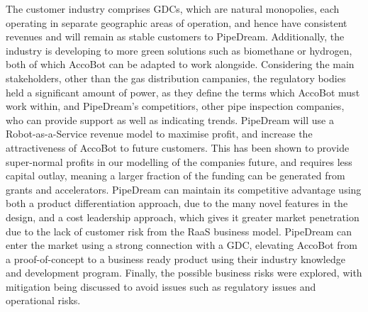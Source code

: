 \documentclass[11pt]{article}		%
\newcommand{\supercite}[1]{\textsuperscript{\cite{#1}}}		%
\begin{document}
        The customer industry comprises GDCs, which are natural monopolies, each operating in separate geographic areas of operation, and hence have consistent revenues and will remain as stable customers to PipeDream. Additionally, the industry is developing to more green solutions such as biomethane or hydrogen, both of which AccoBot can be adapted to work alongside.
        Considering the main stakeholders, other than the gas distribution campanies, the regulatory bodies held a significant amount of power, as they define the terms which AccoBot must work within, and PipeDream's competitiors, other pipe inspection companies, who can provide support as well as indicating trends.
        PipeDream will use a Robot-as-a-Service revenue model to maximise profit, and increase the attractiveness of AccoBot to future customers.
        This has been shown to provide super-normal profits in our modelling of the companies future, and requires less capital outlay, meaning a larger fraction of the funding can be generated from grants and accelerators.
        PipeDream can maintain its competitive advantage using both a product differentiation approach, due to the many novel features in the design, and a cost leadership approach, which gives it greater market penetration due to the lack of customer risk from the RaaS business model.
        PipeDream can enter the market using a strong connection with a GDC, elevating AccoBot from a proof-of-concept to a business ready product using their industry knowledge and development program.
        Finally, the possible business risks were explored, with mitigation being discussed to avoid issues such as regulatory issues and operational risks.
        
         

	\pagebreak		%
	
	
	
	
	\begin{multicols}{2}
		\begingroup\onehalfspacing
			{\tiny
				
				
			}
		\endgroup
	\end{multicols}
	
\end{document}

